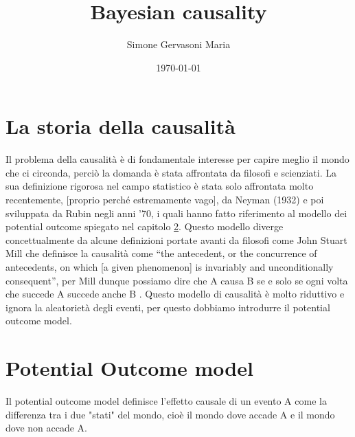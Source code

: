 \documentclass{article}
\title{Bayesian causality}
\author{Simone Gervasoni Maria}
\date{\today}
\begin{document}
\thispagestyle{empty}
\maketitle
\pagebreak
 
\thispagestyle{empty}
\tableofcontents
\clearpage

\section{La storia della causalità}
\label{sect:History Causality}

Il problema della causalità è di fondamentale interesse per capire meglio il mondo che ci circonda, perciò la domanda è stata affrontata da  filosofi e scienziati. La sua definizione rigorosa nel campo statistico è stata solo affrontata molto recentemente, [proprio perché estremamente vago], da Neyman (1932) e poi sviluppata da Rubin negli anni '70, i quali hanno fatto riferimento al modello dei potential outcome spiegato nel capitolo \ref{sect:PotentialOM}. Questo modello diverge concettualmente da alcune definizioni portate avanti da  filosofi come John Stuart Mill che definisce la causalità come “the antecedent, or the concurrence of antecedents, on which [a given phenomenon] is invariably and unconditionally consequent”, per Mill dunque possiamo dire che A causa B se e solo se ogni volta che succede A succede anche B . Questo modello di causalità è molto riduttivo e ignora la aleatorietà degli eventi, per questo dobbiamo introdurre il potential outcome model. 

% 

\section{Potential Outcome model}
\label{sect:PotentialOM}
Il potential outcome model definisce l'effetto causale di un evento A come la differenza tra i due "stati" del mondo, cioè il mondo dove accade A e il mondo dove non accade A.
\end{document}
